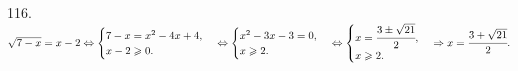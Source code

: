 116. $\sqrt{7-x}=x-2\Leftrightarrow\begin{cases} 7-x=x^2-4x+4,\\ x-2\geqslant0.\end{cases}\Leftrightarrow\begin{cases} x^2-3x-3=0,\\ x\geqslant2.\end{cases}\Leftrightarrow\begin{cases} x=\cfrac{3\pm\sqrt{21}}{2},\\ x\geqslant2.\end{cases}\Rightarrow x=\cfrac{3+\sqrt{21}}{2}.$\\
